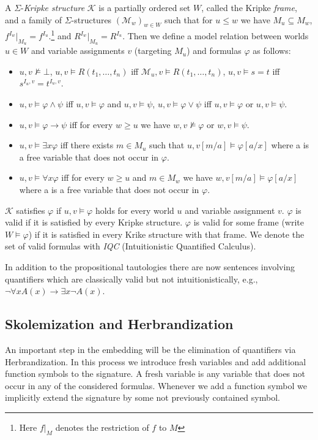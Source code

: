 \documentclass[runningheads]{llncs}
\begin{document}
\begin{definition}
A $\Sigma$-\emph{Kripke structure} $\mathcal{K}$ is a partially ordered set $W$, called the Kripke \emph{frame}, and a family of $\Sigma$-structures $(\mathcal{M}_w)_{w\in W}$ such that for $u\leq w$ we have $M_u\subseteq M_w$, $f^{I_w}|_{M_u} = f^{I_u}$.\footnote{Here $f|_M$ denotes the restriction of $f$ to $M$} and $R^{I_w}|_{M_u} = R^{I_u}$.
	Then we define a model relation between worlds $u\in W$ and variable assignments $v$ (targeting $M_u$) and formulas $\varphi$ as follows:
	\begin{itemize}
		\item $u, v\not\models\bot$, $u, v\models R(t_1,\dots,t_n)$ iff $\mathcal M_u, v\models R(t_1,\dots,t_n)$, $u, v\models s = t$ iff $s^{I_u, v} = t^{I_u, v}$.
		\item $u, v\models \varphi\wedge \psi$ iff $u, v\models\varphi$ and $u, v\models\psi$, $u, v\models \varphi\vee\psi$ iff $u, v\models\varphi$ or $u, v\models\psi$.
		\item $u, v\models \varphi\to\psi$ iff for every $w\geq u$ we have $w, v\not\models\varphi$ or $w, v\models\psi$.
		\item $u, v\models\exists x\varphi$ iff there exists $m\in M_u$ such that $u, v[m/a]\models\varphi[a/x]$ where a is a free variable that does not occur in $\varphi$.
		\item $u, v\models\forall x\varphi$ iff for every $w\geq u$ and $m\in M_w$ we have $w, v[m/a]\models\varphi[a/x]$ where a is a free variable that does not occur in $\varphi$.
	\end{itemize}
	$\mathcal{K}$ satisfies $\varphi$ if $u, v\models\varphi$ holds for every world $u$ and variable assignment $v$. $\varphi$ is valid if it is satisfied by every Kripke structure.
$\varphi$ is valid for some frame (write $W\models\varphi$) if it is satisfied in every Krike structure with that frame. We denote the set of valid formulas with \emph{IQC} (Intuitionistic Quantified Calculus).
\end{definition}
In addition to the propositional tautologies there are now sentences involving quantifiers which are classically valid but not intuitionistically, e.g., $\neg\forall x A(x)\to \exists x \neg A(x)$.

\subsection{Skolemization and Herbrandization}

An important step in the embedding will be the elimination of quantifiers via Herbrandization.
In this process we introduce fresh variables and add additional function symbols to the signature.
A fresh variable is any variable that does not occur in any of the considered formulas.
Whenever we add a function symbol we implicitly extend the signature by some not previously contained symbol.
\end{document}
